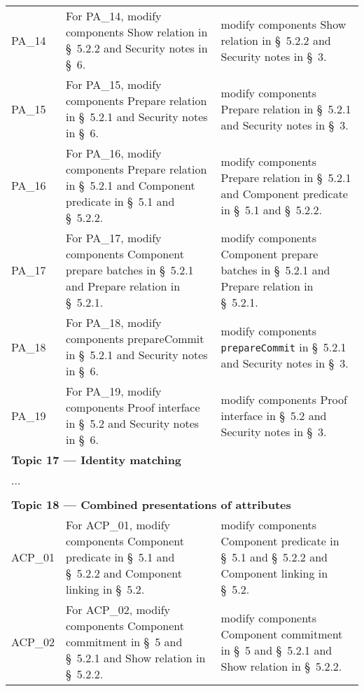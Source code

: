 \begin{landscape}
\begin{longtable}{p{3cm} p{10cm} p{7cm}}
PA\_14 &
For PA\_14, modify components Show relation in \S~5.2.2 and Security notes in \S~6. &
modify components Show relation in \S~5.2.2 and Security notes in \S~3. \\

PA\_15 &
For PA\_15, modify components Prepare relation in \S~5.2.1 and Security notes in \S~6. &
modify components Prepare relation in \S~5.2.1 and Security notes in \S~3. \\

PA\_16 &
For PA\_16, modify components Prepare relation in \S~5.2.1 and Component predicate in \S~5.1 and \S~5.2.2. &
modify components Prepare relation in \S~5.2.1 and Component predicate in \S~5.1 and \S~5.2.2. \\

PA\_17 &
For PA\_17, modify components Component prepare batches in \S~5.2.1 and Prepare relation in \S~5.2.1. &
modify components Component prepare batches in \S~5.2.1 and Prepare relation in \S~5.2.1. \\

PA\_18 &
For PA\_18, modify components prepareCommit in \S~5.2.1 and Security notes in \S~6. &
modify components \texttt{prepareCommit} in \S~5.2.1 and Security notes in \S~3. \\

PA\_19 &
For PA\_19, modify components Proof interface in \S~5.2 and Security notes in \S~6. &
modify components Proof interface in \S~5.2 and Security notes in \S~3. \\[1em]


\multicolumn{3}{l}{\textbf{Topic 17 — Identity matching}}\\

\multicolumn{3}{l}{...}\\\\[-0.5em]


\multicolumn{3}{l}{\textbf{Topic 18 — Combined presentations of attributes}}\\

ACP\_01 &
For ACP\_01, modify components Component predicate in \S~5.1 and \S~5.2.2 and Component linking in \S~5.2. &
modify components Component predicate in \S~5.1 and \S~5.2.2 and Component linking in \S~5.2. \\

ACP\_02 &
For ACP\_02, modify components Component commitment in \S~5 and \S~5.2.1 and Show relation in \S~5.2.2. &
modify components Component commitment in \S~5 and \S~5.2.1 and Show relation in \S~5.2.2. \\


\end{longtable}
\end{landscape}
